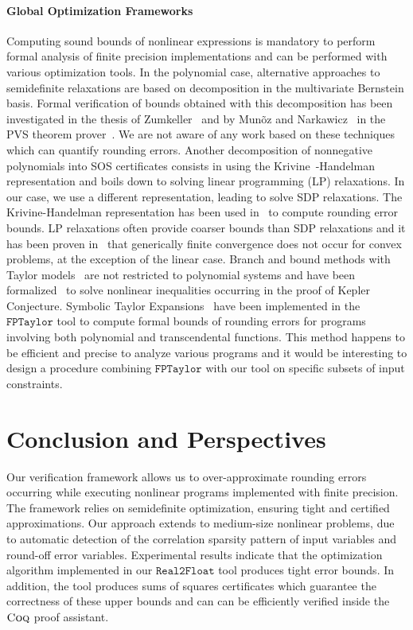 \documentclass[preprint,fleqn,nocopyrightspace]{sigplanconf}
\newcommand{\realtofloat}{\mathtt{Real2Float}}
\newcommand{\coq}{\text{\sc Coq}}
\newcommand{\fptaylor}{\mathtt{FPTaylor}}
\theoremstyle{plain}
\begin{document}
\paragraph{Global Optimization Frameworks}
Computing sound bounds of nonlinear expressions is mandatory to perform formal analysis of finite precision implementations and can be performed with various optimization tools. 
In the polynomial case, alternative approaches to semidefinite relaxations are based on decomposition in the multivariate Bernstein basis. Formal verification of bounds obtained with this decomposition has been investigated in the thesis of Zumkeller~\cite{ZumkellerPhD} and by Mun\~oz and Narkawicz~\cite{MN13} in the PVS theorem prover~\cite{PVS}. We are not aware of any work based on these techniques which can quantify rounding errors. Another decomposition of nonnegative polynomials into SOS certificates consists in using the Krivine~\cite{Krivine1964b}-Handelman~\cite{Handelman1988} representation and boils down to solving linear programming (LP) relaxations. In our case, we use a different representation, leading to solve SDP relaxations. The Krivine-Handelman representation has been used in~\cite{Boland10HGR} to compute rounding error bounds. LP relaxations often provide coarser bounds than SDP relaxations and it has been proven in~\cite{lasserre2009moments} that generically finite convergence does not occur for convex problems, at the exception of the linear case. 
Branch and bound methods with Taylor models~\cite{Berz09} are not restricted to polynomial systems and have been formalized~\cite{SolovyevH13} to solve nonlinear inequalities occurring in the proof of Kepler Conjecture. Symbolic Taylor Expansions~\cite{fptaylor15} have been implemented in the $\fptaylor$ tool to compute formal bounds of rounding errors for programs involving both polynomial and transcendental functions. This method happens to be efficient and precise to analyze various programs and it would be interesting to design a procedure combining $\fptaylor$ with our tool on specific subsets of input constraints.
%
\vspace*{-0.2cm}
\section{Conclusion and Perspectives} %
%
Our verification framework allows us to over-approximate rounding errors occurring while executing nonlinear programs implemented with finite precision.
The framework relies on semidefinite optimization, ensuring tight and certified approximations. Our approach extends to medium-size nonlinear problems, due to  automatic detection of the correlation sparsity pattern of input variables and round-off error variables. Experimental results indicate that the optimization algorithm implemented in our $\realtofloat$ tool produces tight error bounds. In addition, the tool produces sums of squares certificates which guarantee the correctness of these upper bounds and can can be efficiently verified inside the $\coq$ proof assistant.
\end{document}
